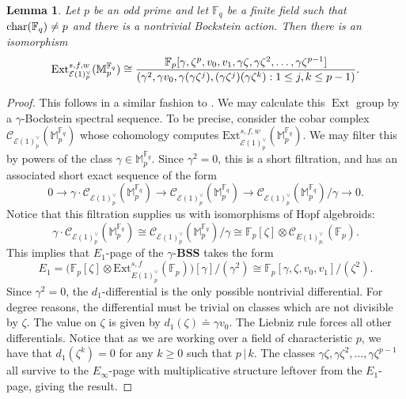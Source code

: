 \documentclass{amsart}
\newtheorem{lemma}[theorem]{Lemma}
\theoremstyle{plain}
\numberwithin{theorem}{section}
\numberwithin{equation}{section}
\numberwithin{figure}{section}
\DeclareMathOperator{\Ext}{Ext}
\newcommand{\0}{\langle 0 \rangle }
\begin{document}
\begin{lemma}
\label{bockstein BPGL1 Mass E2}
    Let $p$ be an odd prime and let $\mathbb{F}_q$ be a finite field such that $\textup{char}(\mathbb{F}_q) \neq p$ and there is a nontrivial Bockstein action. Then there is an isomorphism
    \[
    \textup{Ext}^{s,f,w}_{\mathcal{E}(1)^\vee_p}(\mathbb{M}_p^{\mathbb{F}_q}) \cong \frac{\mathbb{F}_p[\gamma, \zeta^p, v_0, v_1, \gamma\zeta, \gamma \zeta^2, \dots, \gamma \zeta^{p-1}]}{(\gamma^2, \gamma v_0, \gamma(\gamma \zeta^j), (\gamma\zeta^j)(\gamma\zeta^k) : 1 \leq j, k \leq p-1)}.
    \]
\end{lemma}

\begin{proof}
    This follows in a similar fashion to \cite[Proposition 7.7]{Wilson16}. We may calculate this $\Ext$ group by a $\gamma$-Bockstein spectral sequence. To be precise, consider the cobar complex $\mathcal{C}_{\mathcal{E}(1)^\vee_p}(\mathbb{M}_p^{\mathbb{F}_q})$ whose cohomology computes $\text{Ext}^{s,f,w}_{\mathcal{E}(1)^\vee_p}(\mathbb{M}_p^{\mathbb{F}_q})$. We may filter this by powers of the class $\gamma \in \mathbb{M}_p^{\mathbb{F}_q}$. Since $\gamma^2=0$, this is a short filtration, and has an associated short exact sequence of the form
    \[0 \to \gamma \cdot\mathcal{C}_{\mathcal{E}(1)^\vee_p}(\mathbb{M}_p^{\mathbb{F}_q}) \to \mathcal{C}_{\mathcal{E}(1)^\vee_p}(\mathbb{M}_p^{\mathbb{F}_q}) \to \mathcal{C}_{\mathcal{E}(1)^\vee_p}(\mathbb{M}_p^{\mathbb{F}_q})/\gamma \to 0.\]
    Notice that this filtration supplies us with isomorphisms of Hopf algebroids:
    \[\gamma \cdot\mathcal{C}_{\mathcal{E}(1)^\vee_p}(\mathbb{M}_p^{\mathbb{F}_q}) \cong \mathcal{C}_{\mathcal{E}(1)^\vee_p} ( \mathbb{M}_p^{\mathbb{F}_q} ) /\gamma \cong \mathbb{F}_p[\zeta] \otimes \mathcal{C}_{E(1)^\vee_{p,}}(\mathbb{F}_p).\] 
    This implies that $E_1$-page of the $\gamma$-\textbf{BSS} takes the form
    \[E_1 = \Big( \mathbb{F}_p[\zeta] \otimes\text{Ext}^{s,f}_{E(1)^\vee_{p}} ( \mathbb{F}_p) \Big) [\gamma]/(\gamma^2) \cong \mathbb{F}_p[\gamma, \zeta, v_0,v_1]/(\zeta^2).\]
    Since $\gamma^2=0$, the $d_1$-differential is the only possible nontrivial differential. For degree reasons, the differential must be trivial on classes which are not divisible by $\zeta$. The value on $\zeta$ is given by $d_1(\zeta) \doteq \gamma v_0$. The Liebniz rule forces all other differentials. Notice that as we are working over a field of characteristic $p$, we have that $d_1(\zeta^k)=0$ for any $k \geq 0$ such that $p \,|\, k$. The classes $\gamma \zeta, \gamma\zeta^2, \dots, \gamma \zeta^{p-1}$ all survive to the $E_\infty$-page with multiplicative structure leftover from the $E_1$-page, giving the result.
\end{proof}
\end{document}
